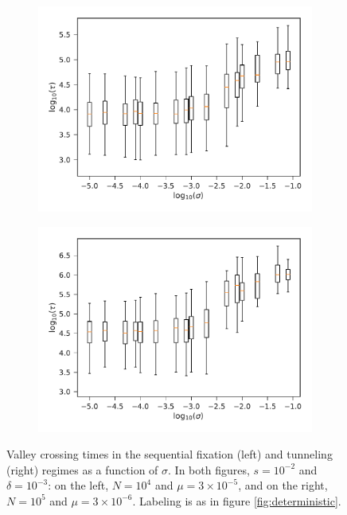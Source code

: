 \documentclass[rmp]{revtex4}
\begin{document}
\begin{spacing}{1.5}
\begin{figure}
\begin{subfigure}[b]{0.4\textwidth}
\includegraphics[width=\textwidth]{Figures/seq_fix.pdf}
\end{subfigure}
\begin{subfigure}[b]{0.4\textwidth}
\includegraphics[width=\textwidth]{Figures/neut_tunnel.pdf}
\end{subfigure}
\caption{Valley crossing times in the sequential fixation (left) and tunneling (right) regimes as a function of $\sigma$. In both figures, $s = 10^{-2}$ and $\delta = 10^{-3}$: on the left, $N = 10^4$ and $\mu = 3\times 10^{-5}$, and on the right, $N = 10^5$ and $\mu = 3\times 10^{-6}$. Labeling is as in figure \ref{fig:deterministic}.}
\label{fig:tunneling}
\end{figure}


\end{spacing}
\end{document}
